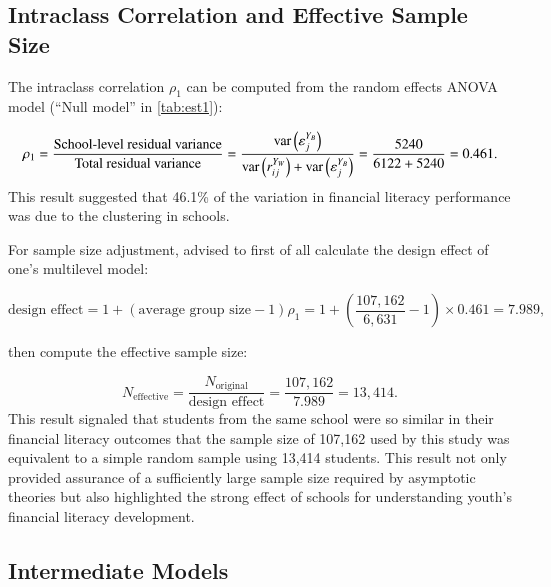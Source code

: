 \subsection{Intraclass Correlation and Effective Sample Size}

The intraclass correlation $\rho_1$ can be computed from the random effects ANOVA model (``Null model'' in \cref{tab:est1}):

%

%

\begin{equation}
    \rho_1 = \frac{\text{School-level residual variance}}{\text{Total residual variance}}
    =\frac{\text{var}\left(\varepsilon^{Y_B}_j\right)}{\text{var}\left(r^{Y_W}_{ij}\right) + \text{var}\left(\varepsilon^{Y_B}_j\right)}
    = \frac{5240}{6122 + 5240}
    = 0.461.
\end{equation}
\noindent This result suggested that 46.1\% of the variation in financial literacy performance was due to the clustering in schools.

For sample size adjustment, \citet{snijders:2012} advised to first of all calculate the design effect of one's multilevel model:

\begin{equation}\label{eqn:design}
    \text{design effect} = 1 + (\text{average group size} - 1) \rho_1 = 1 + \left( \frac{107,162}{6,631} - 1 \right) \times 0.461 = 7.989,
\end{equation}

\noindent then compute the effective sample size:

\begin{equation}
    N_\text{effective} = \frac{N_\text{original}}{\text{design effect}} = \frac{107,162}{7.989} = 13,414.
\end{equation}
\noindent This result signaled that students from the same school were so similar in their financial literacy outcomes that the sample size of 107,162 used by this study was equivalent to a simple random sample using 13,414 students. This result not only provided assurance of a sufficiently large sample size required by asymptotic theories but also highlighted the strong effect of schools for understanding youth's financial literacy development.

\subsection{Intermediate Models}

